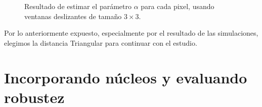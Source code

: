\begin{figure}[htb]
\begin{minipage}[b]{0.55\linewidth}
		\caption{\small Resultado de estimar el parámetro $\alpha$ para cada pixel, usando ventanas deslizantes de tamaño  $3\times 3$.}
	\end{minipage}
\end{figure}

Por lo anteriormente expuesto, especialmente por el resultado de las simulaciones, elegimos la distancia Triangular para continuar con el estudio.

\section{Incorporando núcleos y evaluando robustez}
\label{jstar}

